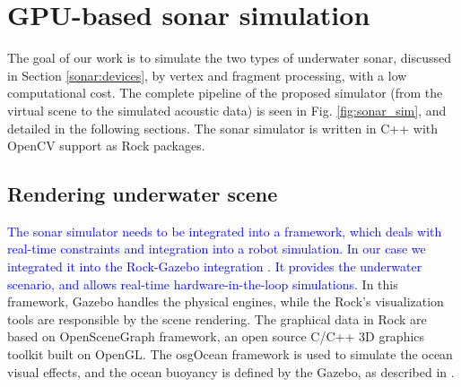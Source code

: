 \documentclass[final,5p,times]{elsarticle}
\begin{document}

\section{GPU-based sonar simulation}
\label{dev}

The goal of our work is to simulate the two types of underwater sonar, discussed in Section \ref{sonar:devices}, by vertex and fragment processing, with a low computational cost. The complete pipeline of the proposed simulator (from the virtual scene to the simulated acoustic data) is seen in Fig. \ref{fig:sonar_sim}, and detailed in the following sections. The sonar simulator is written in C++ with OpenCV \cite{bradski2000} support as
Rock packages.


\subsection{Rendering underwater scene}
\label{dev:uwscene}

\textcolor{blue}{The sonar simulator needs to be integrated into a framework, which deals with real-time constraints and integration into a robot simulation. In our case we integrated it into the Rock-Gazebo integration \cite{watanabe2015}. It provides the underwater scenario, and allows real-time hardware-in-the-loop simulations.} In this framework, Gazebo handles the physical engines, while the Rock's visualization tools are responsible by the scene rendering. The graphical data in Rock are based on OpenSceneGraph framework, an open source C/C++ 3D graphics toolkit built on OpenGL. The osgOcean framework is used to simulate the ocean visual effects, and the ocean buoyancy is defined by the Gazebo, as described in \cite{watanabe2015}.
\end{document}

